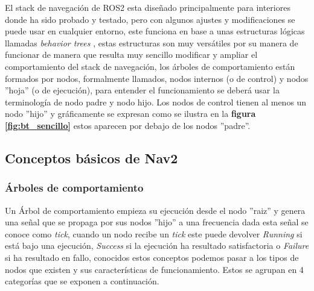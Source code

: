 El stack de navegación de ROS2 esta diseñado principalmente para interiores donde ha sido probado y testado, pero con algunos ajustes y modificaciones se puede usar en cualquier entorno, este funciona en base a unas estructuras 
lógicas llamadas \textit{behavior trees} \cite{colledanchise2018behavior}, estas estructuras son muy versátiles por su manera de funcionar de manera que resulta muy 
sencillo modificar y ampliar el comportamiento del stack de navegación, los árboles de comportamiento están formados por nodos, formalmente llamados, 
nodos internos (o de control) y nodos ''hoja'' (o de ejecución), para entender el funcionamiento se deberá usar la terminología de nodo padre y nodo hijo. 
Los nodos de control tienen al menos un nodo ''hijo'' y gráficamente se expresan como se ilustra en la \textbf{figura \ref{fig:bt_sencillo}}  estos aparecen por debajo de 
los nodos ''padre''.

\subsection{Conceptos básicos de Nav2}
\subsubsection{Árboles de comportamiento}
Un Árbol de comportamiento empieza su ejecución desde el nodo ''raiz'' y genera una señal que se propaga por sus nodos ''hijo'' a una frecuencia dada 
esta señal se conoce como \textit{tick}, cuando un nodo recibe un \textit{tick} este puede devolver \textit{Running} si está bajo una ejecución, 
\textit{Success} si la ejecución ha resultado satisfactoria o \textit{Failure} si ha resultado en fallo, conocidos estos conceptos podemos pasar 
a los tipos de nodos que existen y sus características de funcionamiento. Estos se agrupan en 4 categorías que se exponen a continuación.

